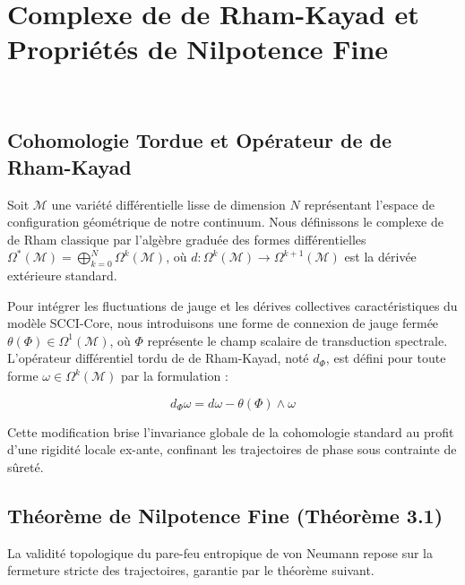 \chapter{Complexe de de Rham-Kayad et Propri{\'e}t{\'e}s de Nilpotence Fine}
\(\label{ch:derham_kayad}\)

\section{Cohomologie Tordue et Op{\'e}rateur de de Rham-Kayad}
Soit \(\mathcal{M}\) une vari{\'e}t{\'e} diff{\'e}rentielle lisse de dimension \(N\) repr{\'e}sentant l'espace de configuration g{\'e}om{\'e}trique de notre continuum. Nous d{\'e}finissons le complexe de de Rham classique par l'alg{\`e}bre gradu{\'e}e des formes diff{\'e}rentielles \(\Omega^*(\mathcal{M}) = \bigoplus_{k=0}^N \Omega^k(\mathcal{M})\), o{\`u} \(d : \Omega^k(\mathcal{M}) \to \Omega^{k+1}(\mathcal{M})\) est la d{\'e}riv{\'e}e ext{\'e}rieure standard.

Pour int{\'e}grer les fluctuations de jauge et les d{\'e}rives collectives caract{\'e}ristiques du mod{\`e}le SCCI-Core, nous introduisons une forme de connexion de jauge ferm{\'e}e \(\theta(\Phi) \in \Omega^1(\mathcal{M})\), o{\`u} \(\Phi\) repr{\'e}sente le champ scalaire de transduction spectrale. L'op{\'e}rateur diff{\'e}rentiel tordu de de Rham-Kayad, not{\'e} \(d_{\Phi}\), est d{\'e}fini pour toute forme \(\omega \in \Omega^k(\mathcal{M})\) par la formulation :

\[d_{\Phi}\omega = d\omega - \theta(\Phi) \wedge \omega\]

Cette modification brise l'invariance globale de la cohomologie standard au profit d'une rigidit{\'e} locale ex-ante, confinant les trajectoires de phase sous contrainte de s{\^u}ret{\'e}.

\section{Th{\'e}or{\`e}me de Nilpotence Fine (Th{\'e}or{\`e}me 3.1)}
La validit{\'e} topologique du pare-feu entropique de von Neumann repose sur la fermeture stricte des trajectoires, garantie par le th{\'e}or{\`e}me suivant.

\)

